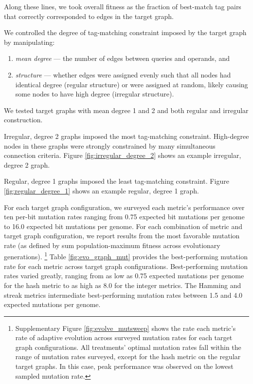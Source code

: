 Along these lines, we took overall fitness as the fraction of best-match tag pairs that correctly corresponded to edges in the target graph.

We controlled the degree of tag-matching constraint imposed by the target graph by manipulating:
\begin{enumerate}
  \item \textit{mean degree} --- the number of edges between queries and operands, and
  \item \textit{structure} --- whether edges were assigned evenly such that all nodes had identical degree (regular structure) or were assigned at random, likely causing some nodes to have high degree (irregular structure).
\end{enumerate}
We tested target graphs with mean degree 1 and 2 and both regular and irregular construction.

Irregular, degree 2 graphs imposed the most tag-matching constraint.
High-degree nodes in these graphs were strongly constrained by many simultaneous connection criteria.
Figure \ref{fig:irregular_degree_2} shows an example irregular, degree 2 graph.

Regular, degree 1 graphs imposed the least tag-matching constraint.
Figure \ref{fig:regular_degree_1} shows an example regular, degree 1 graph.

For each target graph configuration, we surveyed each metric's performance over ten per-bit mutation rates ranging from 0.75 expected bit mutations per genome to 16.0 expected bit mutations per genome.
For each combination of metric and target graph configuration, we report results from the most favorable mutation rate (as defined by sum population-maximum fitness across evolutionary generations).%
\footnote{%
Supplementary Figure \ref{fig:evolve_mutsweep} shows the rate each metric's rate of adaptive evolution across surveyed mutation rates for each target graph configurations.
All treatments' optimal mutation rates fall within the range of mutation rates surveyed, except for the hash metric on the regular target graphs.
In this case, peak performance was observed on the lowest sampled mutation rate.
}
Table \ref{fig:evo_graph_mut} provides the best-performing mutation rate for each metric across target graph configurations.
Best-performing mutation rates varied greatly, ranging from as low as 0.75 expected mutations per genome for the hash metric to as high as 8.0 for the integer metrics.
The Hamming and streak metrics intermediate best-performing mutation rates between 1.5 and 4.0 expected mutations per genome.

